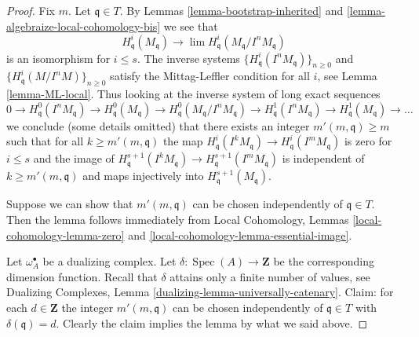 \documentclass[10pt,a4paper]{amsart}
\theoremstyle{plain}
\theoremstyle{definition}
\theoremstyle{remark}
\numberwithin{equation}{subsection}
\def\lim{\mathop{\mathrm{lim}}\nolimits}
\def\Spec{\mathop{\mathrm{Spec}}}
\begin{document}
\begin{proof}
Fix $m$. Let $\mathfrak q \in T$.
By Lemmas \ref{lemma-bootstrap-inherited} and
\ref{lemma-algebraize-local-cohomology-bis}
we see that
$$
H^i_\mathfrak q(M_\mathfrak q)
\longrightarrow
\lim H^i_\mathfrak q(M_\mathfrak q/I^nM_\mathfrak q)
$$
is an isomorphism for $i \leq s$. The inverse systems
$\{H^i_\mathfrak q(I^nM_\mathfrak q)\}_{n \geq 0}$ and
$\{H^i_\mathfrak q(M/I^nM)\}_{n \geq 0}$
satisfy the Mittag-Leffler condition for all $i$, see
Lemma \ref{lemma-ML-local}. Thus looking at the inverse system of
long exact sequences
$$
0 \to H^0_\mathfrak q(I^nM_\mathfrak q) \to
H^0_\mathfrak q(M_\mathfrak q) \to
H^0_\mathfrak q(M_\mathfrak q/I^nM_\mathfrak q) \to
H^1_\mathfrak q(I^nM_\mathfrak q) \to
H^1_\mathfrak q(M_\mathfrak q) \to \ldots
$$
we conclude (some details omitted) that there exists an integer
$m'(m, \mathfrak q) \geq m$ such that for all $k \geq m'(m, \mathfrak q)$
the map
$H^i_\mathfrak q(I^kM_\mathfrak q) \to H^i_\mathfrak q(I^mM_\mathfrak q)$
is zero for $i \leq s$ and the image of
$H^{s + 1}_\mathfrak q(I^kM_\mathfrak q) \to
H^{s + 1}_\mathfrak q(I^mM_\mathfrak q)$
is independent of $k \geq m'(m, \mathfrak q)$ and
maps injectively into $H^{s + 1}_\mathfrak q(M_\mathfrak q)$.

\medskip\noindent
Suppose we can show that $m'(m, \mathfrak q)$ can be chosen
independently of $\mathfrak q \in T$.
Then the lemma follows immediately from
Local Cohomology, Lemmas \ref{local-cohomology-lemma-zero} and
\ref{local-cohomology-lemma-essential-image}.

\medskip\noindent
Let $\omega_A^\bullet$ be a dualizing complex. Let
$\delta : \Spec(A) \to \mathbf{Z}$ be the corresponding
dimension function. Recall that $\delta$ attains only a
finite number of values, see
Dualizing Complexes, Lemma \ref{dualizing-lemma-universally-catenary}.
Claim: for each $d \in \mathbf{Z}$ the integer
$m'(m, \mathfrak q)$ can be chosen independently
of $\mathfrak q \in T$ with $\delta(\mathfrak q) = d$.
Clearly the claim implies the lemma by what we said above.


\end{proof}
\end{document}
